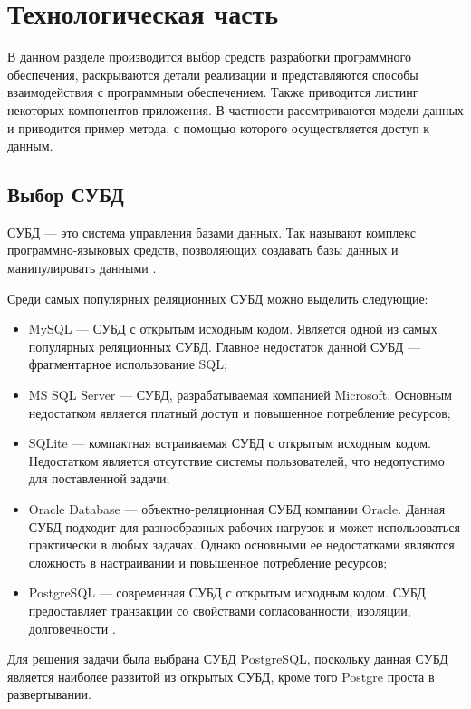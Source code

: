 \chapter{Технологическая часть}

В данном разделе производится выбор средств разработки программного обеспечения, раскрываются детали реализации и представляются способы взаимодействия с программным обеспечением. Также приводится листинг некоторых компонентов приложения. В частности рассмтриваются модели данных и приводится пример метода, с помощью которого осуществляется доступ к данным.


\section{Выбор СУБД}

СУБД --- это система управления базами данных. Так называют комплекс программно-языковых средств, позволяющих создавать базы данных и манипулировать данными \cite{7}.

Среди самых популярных реляционных СУБД можно выделить следующие:

\begin{itemize}
	\item MySQL --- СУБД с открытым исходным кодом. Является одной из самых популярных реляционных СУБД. Главное недостаток данной СУБД --- фрагментарное использование SQL;
	\item MS SQL Server --- СУБД, разрабатываемая компанией Microsoft. Основным недостатком является платный доступ и повышенное потребление ресурсов;
 	\item SQLite --- компактная встраиваемая СУБД с открытым исходным кодом. Недостатком является отсутствие системы пользователей, что недопустимо для поставленной задачи;
  	\item Oracle Database --- объектно-реляционная СУБД компании Oracle. Данная СУБД подходит для разнообразных рабочих нагрузок и может использоваться практически в любых задачах. Однако основными ее недостатками являются сложность в настраивании и повышенное потребление ресурсов;
   \item PostgreSQL --- современная СУБД с открытым исходным кодом. СУБД предоставляет транзакции со свойствами согласованности, изоляции, долговечности \cite{4}.
\end{itemize}

Для решения задачи была выбрана СУБД PostgreSQL, поскольку данная СУБД является наиболее развитой из открытых СУБД, кроме того Postgre проста в развертывании.

